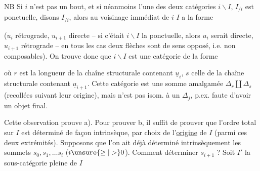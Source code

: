 

NB Si $i$ n'est pas un bout, et si néanmoins l'une des deux catégories $i\backslash I$, $I_{/i}$ est ponctuelle, disons $I_{/i}$, alors au voisinage immédiat de $i$ $I$ a la forme


 ($u_i$ rétrograde, $u_{i+1}$ directe -- si c'était $i\backslash I$ la ponctuelle, alors $u_i$ serait directe, $u_{i+1}$ rétrograde -- en tous les cas   deux flèches sont de sens opposé, i.e. non composables).  On trouve donc que $i\backslash I$ est une catégorie de la forme


où $r$ est la longueur  de la chaîne structurale contenant $\underline{u}_i$, $s$ celle de la chaîne structurale contenant $\underline{u}_{i+1}$. Cette catégorie est une somme amalgamée $\mathbb{\Delta}_r\amalg\mathbb{\Delta}_s$ (recollées suivant leur origine), mais n'est pas isom. à un $\mathbb{\Delta}_j$, p.ex. faute d'avoir un objet final.

Cette observation prouve a). Pour prouver b, il suffit de prouver que l'ordre total sur $I$ est déterminé de façon intrinsèque,   par  choix de l'\uline{origine}  de $I$ (parmi ces deux extrémités). Supposons que l'on ait déjà déterminé intrinsèquement les sommets $s_0,s_1,\ldots s_i$ ($i\unsure{\geq|>}0$). Comment déterminer $s_{i+1}$ ?   Soit  $I'$ la sous-catégorie pleine de $I$

